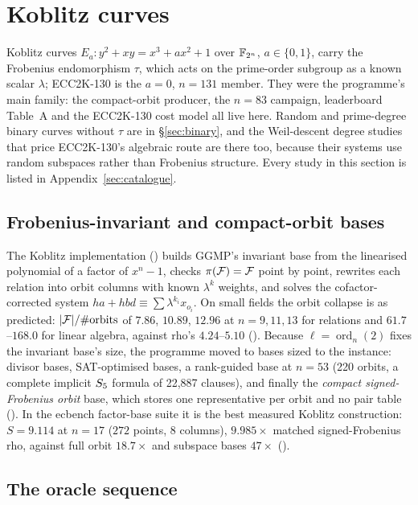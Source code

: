 \section{Koblitz curves}\label{sec:koblitz}

Koblitz curves $E_a: y^2+xy=x^3+ax^2+1$ over $\mathbb{F}_{2^n}$, $a\in\{0,1\}$, carry
the Frobenius endomorphism $\tau$, which acts on the prime-order subgroup as
a known scalar $\lambda$; ECC2K-130 is the $a=0$, $n=131$ member. They were
the programme's main family: the compact-orbit producer, the $n=83$
campaign, leaderboard Table~A and the ECC2K-130 cost model all live here.
Random and prime-degree binary curves without $\tau$ are in
\S\ref{sec:binary}, and the Weil-descent degree studies that price
ECC2K-130's algebraic route are there too, because their systems use random
subspaces rather than Frobenius structure. Every study in this section is
listed in Appendix~\ref{sec:catalogue}.

\subsection{Frobenius-invariant and compact-orbit bases}

The Koblitz implementation ()
builds GGMP's invariant base from the linearised polynomial of a factor of
$x^n-1$, checks $\pi(\mathcal{F})=\mathcal{F}$ point by point, rewrites each relation into
orbit columns with known $\lambda^k$ weights, and solves the
cofactor-corrected system $h a+hbd\equiv\sum\lambda^{k_i}x_{o_i}$. On
small fields the orbit collapse is as predicted: $\lvert \mathcal{F} \rvert/\#\text{orbits}$
of $7.86$, $10.89$, $12.96$ at $n=9,11,13$ for relations and
$61.7$--$168.0$ for linear algebra, against rho's $4.24$--$5.10$
(). Because $\ell=\operatorname{ord}_n(2)$
fixes the invariant base's size, the programme moved to bases sized to the
instance: divisor bases, SAT-optimised bases, a rank-guided base at $n=53$
(220 orbits, a complete implicit $S_{5}$ formula of 22{,}887 clauses), and
finally the \emph{compact signed-Frobenius orbit} base, which stores one
representative per orbit and no pair table
(). In the ecbench factor-base
suite it is the best measured Koblitz construction: $S=9.114$ at $n=17$
($272$ points, 8 columns), $9.985\times$ matched signed-Frobenius rho,
against full orbit $18.7\times$ and subspace bases $47\times$
().

\subsection{The oracle sequence}

